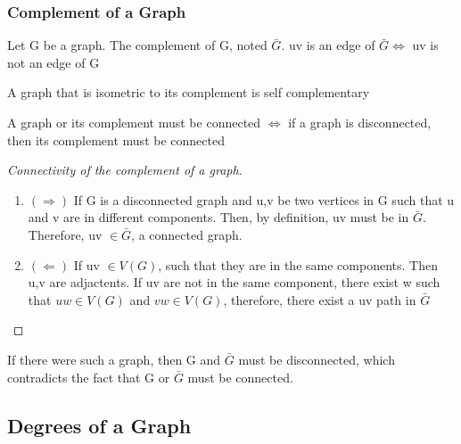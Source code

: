 \documentclass{article}
\begin{document}
\subsubsection{Complement of a Graph}%
\label{ssub:Complement of a Graph}

\begin{definition}
    Let G be a graph. The complement of G, noted $\bar G$. uv is an edge of
    $\bar G \Longleftrightarrow $ uv is not an edge of G
\end{definition}

\begin{definition}
    A graph that is isometric to its complement is self complementary
\end{definition}

\begin{theorem}
    A graph or its complement must be connected $\Longleftrightarrow$
    if a graph is disconnected, then its complement must be connected
\end{theorem}

\begin{proof}[Connectivity of the complement of a graph]
    \begin{enumerate}
	    Let's work with the second proposition
	\item $(\Longrightarrow )$ If G is a disconnected graph and u,v be two
	    vertices in G such that u and v are in different components. Then,
	    by definition, uv must be in $\bar G$. Therefore, uv $\in \bar G$, a
	    connected graph.
	\item $(\Longleftarrow)$ If uv $\in V(G)$, such that they are in the same
	    components. Then u,v are adjactents. If uv are not in the same
	    component, there exist w such that $ uw \in V(G)$ and $vw \in V(G)$,
	    therefore, there exist a uv path in $\bar G$
    \end{enumerate}
\end{proof}

\begin{corollary}
    If there were such a graph, then G and $\bar G$ must be disconnected,
    which contradicts the fact that G or $\bar G$ must be connected.
\end{corollary}

\subsection{Degrees of a Graph}%
\label{sub:Degrees of a Graph}
\end{document}
